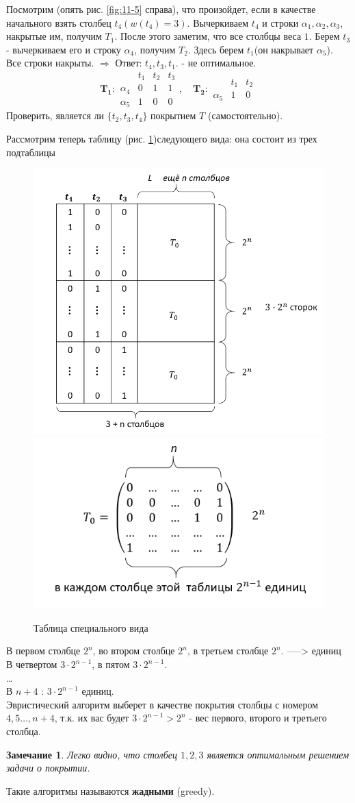 \documentclass{article}
\newtheorem{Remark}{Замечание}
\numberwithin{example}{section}
\numberwithin{question}{section}
\numberwithin{Remark}{section}
\numberwithin{theorem}{section}
\numberwithin{definition}{section}
\numberwithin{proposition}{section}
\begin{document}
Посмотрим (опять рис. \ref{fig:11-5} справа), что произойдет, если в качестве начального взять столбец $t_4 (w(t_4)=3)$. Вычеркиваем $t_4$ и строки $\alpha_1,\alpha_2,\alpha_3$, накрытые им, получим $T_1$. После этого заметим, что все столбцы веса $1$. Берем $t_3$ - вычеркиваем его и строку $\alpha_4$, получим $T_2$. Здесь берем $t_1$(он накрывает $\alpha_5$). Все строки накрыты. $\Rightarrow$ Ответ: $t_4,t_3,t_1$. - не оптимальное.
\begin{displaymath}
\mathbf{T_1} :
\begin{array}{cccc}
& t_{1} & t_{2} &t_3 \\
\alpha_{4} & 0 & 1& 1 \\
\alpha_5 & 1 & 0& 0
\end{array} ,\quad 
\mathbf{T_2} :
\begin{array}{ccc}
& t_{1} & t_{2}  \\
\alpha_{5} & 1 & 0
\end{array}
\end{displaymath}
Проверить, является ли $\{t_2,t_3,t_4\}$ покрытием $T$ (самостоятельно).

Рассмотрим теперь таблицу (рис. \ref{fig:11-7})следующего вида: она состоит из трех подтаблицы\\
\begin{figure}[!htp]
	\centering
	\includegraphics[width=0.5\linewidth]{11-7}
	\includegraphics[width=0.45\linewidth]{11-8}
	\caption{Таблица специального вида}
	\label{fig:11-7}
\end{figure}
В первом столбце $2^n$, во втором столбце $2^n$, в третьем столбце $2^n$. -----> единиц\\
В четвертом  $3\cdot 2^{n-1}$, в пятом $3\cdot 2^{n-1}$.\\
\ldots\\
В $n+4$ : $3\cdot 2^{n-1}$ единиц.\\
Эвристический алгоритм выберет в качестве покрытия столбцы с номером $4,5\ldots,n+4$, т.к. их вас будет $3\cdot 2^{n-1}>2^n$ - вес первого, второго и третьего столбца.
\begin{Remark}
	Легко видно, что столбец $1,2,3$ является оптимальным решением задачи о покрытии.
\end{Remark}
Такие алгоритмы называются \textbf{жадными} (greedy).
\end{document}
